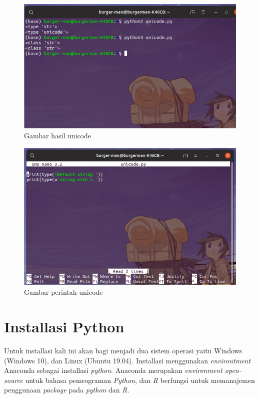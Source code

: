 \begin{enumerate}
\begin{figure}[H]
\centering
\includegraphics[width=1\textwidth]{figures/unicodeuni.png}
\caption{Gambar hasil unicode}
\label{unicodeuni}
\end{figure}

\begin{figure}[H]
\centering
\includegraphics[width=1\textwidth]{figures/unicodeuninano.png}
\caption{Gambar perintah unicode}
\label{unicodeuninano}
\end{figure}

\end{enumerate}

\section{Installasi Python}
Untuk installasi kali ini akan bagi menjadi dua sistem operasi yaitu Windows (Windows 10), dan Linux (Ubuntu 19.04). Installasi menggunakan \textit{environtment} Anaconda sebagai installasi \textit{python}. Anaconda merupakan \textit{environment open-source} untuk bahasa pemrograman \textit{Python}, dan \textit{R} berfungsi untuk memanajemen penggunaan \textit{package} pada \textit{python} dan \textit{R}.


